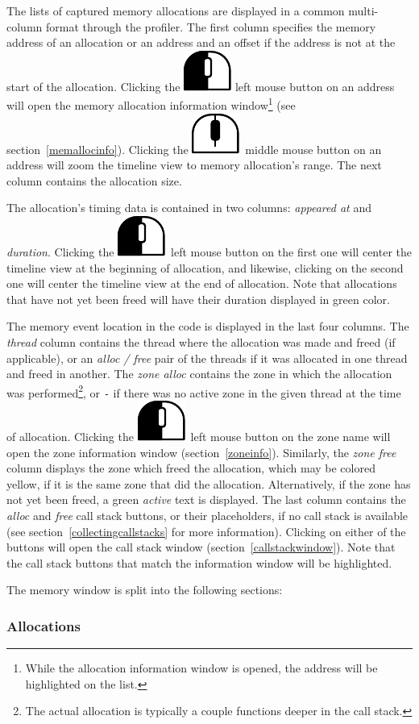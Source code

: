\documentclass[hidelinks,titlepage,a4paper]{article}
\newcommand{\LMB}{\includegraphics[height=.8\baselineskip]{icons/lmb}}
\newcommand{\MMB}{\includegraphics[height=.8\baselineskip]{icons/mmb}}
\begin{document}
The lists of captured memory allocations are displayed in a common multi-column format through the profiler. The first column specifies the memory address of an allocation or an address and an offset if the address is not at the start of the allocation. Clicking the \LMB{} left mouse button on an address will open the memory allocation information window\footnote{While the allocation information window is opened, the address will be highlighted on the list.} (see section~\ref{memallocinfo}). Clicking the \MMB{}~middle mouse button on an address will zoom the timeline view to memory allocation's range. The next column contains the allocation size.

The allocation's timing data is contained in two columns: \emph{appeared at} and \emph{duration}. Clicking the \LMB{}~left mouse button on the first one will center the timeline view at the beginning of allocation, and likewise, clicking on the second one will center the timeline view at the end of allocation. Note that allocations that have not yet been freed will have their duration displayed in green color.

The memory event location in the code is displayed in the last four columns. The \emph{thread} column contains the thread where the allocation was made and freed (if applicable), or an \emph{alloc / free} pair of the threads if it was allocated in one thread and freed in another. The \emph{zone alloc} contains the zone in which the allocation was performed\footnote{The actual allocation is typically a couple functions deeper in the call stack.}, or \texttt{-} if there was no active zone in the given thread at the time of allocation. Clicking the \LMB{}~left mouse button on the zone name will open the zone information window (section~\ref{zoneinfo}). Similarly, the \emph{zone free} column displays the zone which freed the allocation, which may be colored yellow, if it is the same zone that did the allocation. Alternatively, if the zone has not yet been freed, a green \emph{active} text is displayed. The last column contains the \emph{alloc} and \emph{free} call stack buttons, or their placeholders, if no call stack is available (see section~\ref{collectingcallstacks} for more information). Clicking on either of the buttons will open the call stack window (section~\ref{callstackwindow}). Note that the call stack buttons that match the information window will be highlighted.

The memory window is split into the following sections:

\subsubsection{Allocations}
\end{document}
